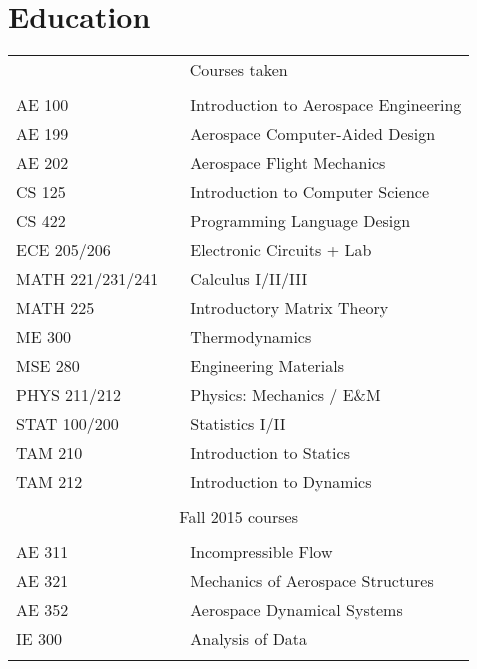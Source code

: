 \documentclass[10pt,letterpaper,sans]{moderncv}
\begin{document}
\section{Education}
\begin{tabular}{l p{1in} l}
  \multicolumn{3}{c}{Courses taken} \\
  \\[3pt]
  AE 100           & \hfill & Introduction to Aerospace Engineering \\
  AE 199           & \hfill & Aerospace Computer-Aided Design       \\
  AE 202           & \hfill & Aerospace Flight Mechanics            \\
  CS 125           & \hfill & Introduction to Computer Science      \\
  CS 422           & \hfill & Programming Language Design           \\
  ECE 205/206      & \hfill & Electronic Circuits + Lab             \\
  MATH 221/231/241 & \hfill & Calculus I/II/III                     \\
  MATH 225         & \hfill & Introductory Matrix Theory            \\
  ME 300           & \hfill & Thermodynamics                        \\
  MSE 280          & \hfill & Engineering Materials                 \\
  PHYS 211/212     & \hfill & Physics: Mechanics / E\&M             \\
  STAT 100/200     & \hfill & Statistics I/II                       \\
  TAM 210          & \hfill & Introduction to Statics               \\
  TAM 212          & \hfill & Introduction to Dynamics              \\
  \\
  \multicolumn{3}{c}{Fall 2015 courses} \\
  \\[3pt]
  AE 311           & \hfill & Incompressible Flow                   \\
  AE 321           & \hfill & Mechanics of Aerospace Structures     \\
  AE 352           & \hfill & Aerospace Dynamical Systems           \\
  IE 300           & \hfill & Analysis of Data                      \\
  \\
\end{tabular}
\end{document}
